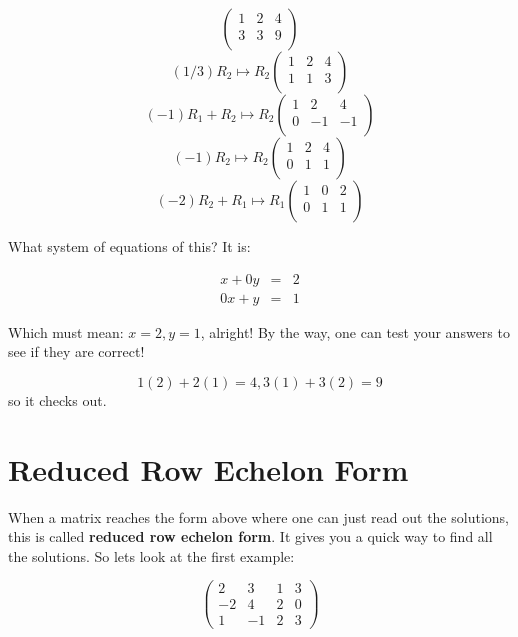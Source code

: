 \documentclass[10pt]{article}
\theoremstyle{definition}
\begin{document}
$$ \left( \begin{array}{rr|r}
1 & 2 & 4\\
3 & 3  & 9\\
\end{array}\right)$$
$$(1/3)R_2\mapsto R_2 \left( \begin{array}{rr|r}
1 & 2 & 4\\
1 & 1  & 3\\
\end{array}\right)$$
$$(-1)R_1+R_2\mapsto R_2 \left( \begin{array}{rr|r}
1 & 2 & 4\\
0 & -1  & -1\\
\end{array}\right)$$
$$(-1)R_2\mapsto R_2 \left( \begin{array}{rr|r}
1 & 2 & 4\\
0 & 1  & 1\\
\end{array}\right)$$
$$(-2)R_2+R_1\mapsto R_1 \left( \begin{array}{rr|r}
1 & 0 & 2\\
0 & 1  & 1\\
\end{array}\right)$$

What system of equations of this?  It is:

\begin{eqnarray*}
x+0y&=&2\\
0x+y&=&1
\end{eqnarray*}

Which must mean: $x=2, y=1$, alright!  By the way, one can test your answers to see if they are correct!

$$1(2)+2(1)=4, 3(1)+3(2)=9$$ so it checks out.


\section{Reduced Row Echelon Form}

When a matrix reaches the form above where one can just read out the solutions, this is called {\bf reduced row echelon form}.  It gives you a quick way to find all the solutions.  So lets look at the first example:


$$ \left( \begin{array}{rrr|r}
2 & 3 & 1& 3\\
-2 & 4 & 2 & 0\\
1 & -1 & 2 & 3
\end{array}\right)$$
\end{document}
